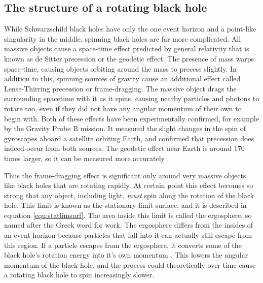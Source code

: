 \documentclass[english, oneside]{HYgradu}
\begin{document}
\subsection{The structure of a rotating black hole}

While Schwarzschild black holes have only the one event horizon and a point-like singularity in the middle, spinning black holes are far more complicated. All massive objects cause a space-time effect predicted by general relativity that is known as de Sitter precession or the geodetic effect. The presence of mass warps space-time, causing objects orbiting around the mass to precess slightly. In addition to this, spinning sources of gravity cause an additional effect called Lense-Thirring precession or frame-dragging. The massive object drags the surrounding spacetime with it as it spins, causing nearby particles and photons to rotate too, even if they did not have any angular momentum of their own to begin with. Both of these effects have been experimentally confirmed, for example by the Gravity Probe B mission. It measured the slight changes in the spin of gyroscopes aboard a satellite orbiting Earth, and confirmed that precession does indeed occur from both sources. The geodetic effect near Earth is around 170 times larger, so it can be measured more accurately \citep{everitt:2009}.

Thus the frame-dragging effect is significant only around very massive objects, like black holes that are rotating rapidly. At certain point this effect becomes so strong that any object, including light, \textit{must} spin along the rotation of the black hole. This limit is known as the stationary limit surface, and it is described in equation \ref{equ:statlimsurf}. The area inside this limit is called the ergosphere, so named after the Greek word for work. The ergosphere differs from the insides of an event horizon because particles that fall into it can actually still escape from this region. If a particle escapes from the ergosphere, it converts some of the black hole's rotation energy into it's own momentum \citep{grintro}. This lowers the angular momentum of the black hole, and the process could theoretically over time cause a rotating black hole to spin increasingly slower.

\end{document}
